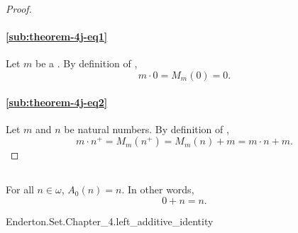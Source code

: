 \documentclass{report}
\begin{document}
  \begin{proof}

    \paragraph{\eqref{sub:theorem-4j-eq1}}%

      Let $m$ be a .
      By definition of , $$m \cdot 0 = M_m(0) = 0.$$

    \paragraph{\eqref{sub:theorem-4j-eq2}}%

      Let $m$ and $n$ be natural numbers.
      By definition of ,
        $$m \cdot n^+ = M_m(n^+) = M_m(n) + m = m \cdot n + m.$$

  \end{proof}

\subsection{}%

  \begin{lemma}
    For all $n \in \omega$, $A_0(n) = n$.
    In other words, $$0 + n = n.$$
  \end{lemma}

    {Enderton.Set.Chapter\_4.left\_additive\_identity}

\end{document}
